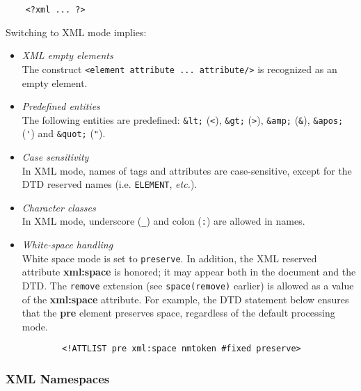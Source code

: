 \begin{verbatim}
	<?xml ... ?>
\end{verbatim}


Switching to XML mode implies:


\begin{itemize}
\item \emph{XML empty elements}\mbox{}\\
  The construct \verb$<element attribute ... attribute/>$ is recognized as 
  an empty element. 
  
\item \emph{Predefined entities}\mbox{}\\
  The following entities are predefined: {\tt \&lt;} (\verb$<$), {\tt \&gt;}
  (\verb$>$), {\tt \&amp;} (\verb$&$), {\tt \&apos;} (\verb$'$) 
  and {\tt \&quot;} (\verb$"$). 
  
\item \emph{Case sensitivity}\mbox{}\\
  In XML mode, names of tags and attributes
  are case-sensitive, except for the DTD 
  reserved names (i.e. {\tt ELEMENT}, \emph{etc.}). 
  
\item \emph{Character classes}\mbox{}\\
  In XML mode, underscore (\verb$_$) and colon (\verb$:$) are
  allowed in names. 

\item \emph{White-space handling}\mbox{}\\
  White space mode is set to {\tt preserve}. In addition,
  the XML reserved attribute
  {\bf xml:space} is honored; it may appear both in the document and the
  DTD. The {\tt remove} extension (see {\tt space(remove)} earlier)  is allowed
  as a value of the {\bf xml:space} attribute. For
  example, the DTD statement below ensures that the {\bf pre} element
  preserves space, regardless of the default processing mode.



\begin{verbatim}
		<!ATTLIST pre xml:space nmtoken #fixed preserve>
\end{verbatim}


\end{itemize}

\subsubsection{XML Namespaces}\label{sec:xmlns}

